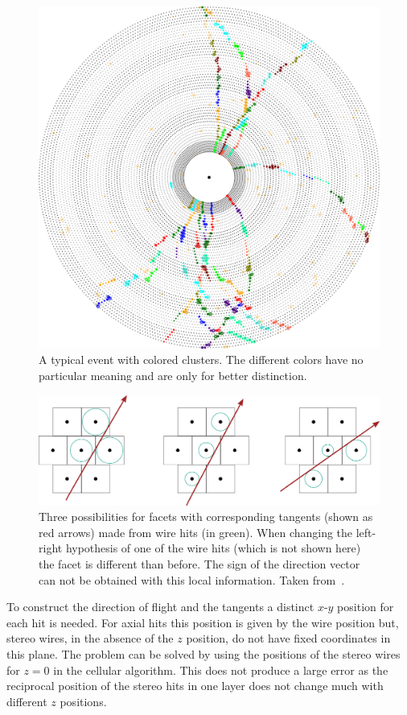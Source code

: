 \begin{figure}
  \centering
  \includegraphics[width=0.8\linewidth]{figures/theory/segments.png} 
  \caption[Clusters in the automaton track finder.]{A typical event with colored clusters. The different colors have no particular meaning and are only for better distinction.}
  \label{fig-clusters}
\end{figure}

\begin{figure}
  \centering
  \includegraphics[width=\linewidth]{figures/theory/facets.pdf}
  \caption[Facets used in the automaton track finder.]{Three possibilities for facets with corresponding tangents (shown as red arrows) made from wire hits (in green). When changing the left-right hypothesis of one of the wire hits (which is not shown here) the facet is different than before. The sign of the direction vector can not be obtained with this local information. Taken from~\cite{oliver}.}
  \label{fig-facets}
\end{figure}

To construct the direction of flight and the tangents a distinct $x$-$y$ position for each hit is needed. For axial hits this position is given by the wire position but, stereo wires, in the absence of the $z$ position, do not have fixed coordinates in this plane. The problem can be solved by using the positions of the stereo wires for $z = 0$ in the cellular algorithm. This does not produce a large error as the reciprocal position of the stereo hits in one layer does not change much with different $z$ positions.

